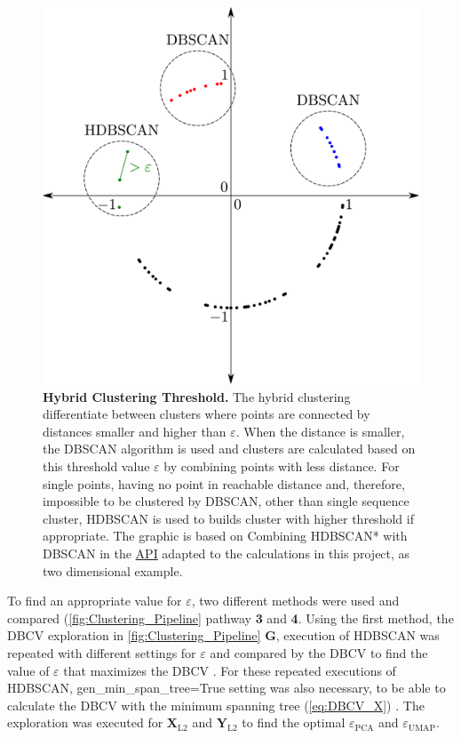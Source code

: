 \begin{figure}[!hbt]
    \centering
    \includegraphics[width=\textwidth]{Graphics/Hybrid.pdf}
    \caption[Hybrid Clustering Threshold]{\textbf{Hybrid Clustering Threshold.} The hybrid clustering differentiate between clusters where points are connected by distances smaller and higher than $\varepsilon$. When the distance is smaller, the \gls{DBSCAN} algorithm is used and clusters are calculated based on this threshold value $\varepsilon$ by combining points with less distance. For single points, having no point in reachable distance and, therefore, impossible to be clustered by \gls{DBSCAN}, other than single sequence cluster, \gls{HDBSCAN} is used to builds cluster with higher threshold if appropriate. The graphic is based on \glqq Combining HDBSCAN* with DBSCAN\grqq{} in the \href{https://hdbscan.readthedocs.io/en/latest/api.html}{API} adapted to the calculations in this project, as two dimensional example.}
    \label{fig:Hybrid}
\end{figure}

To find an appropriate value for $\varepsilon$, two different methods were used and compared (\autoref{fig:Clustering_Pipeline} pathway \textsf{\textbf{3}} and \textsf{\textbf{4}}. Using the first method, the \gls{DBCV} exploration in \autoref{fig:Clustering_Pipeline} \textsf{\textbf{G}}, execution of \gls{HDBSCAN} was repeated with different settings for $\varepsilon$ and compared by the \gls{DBCV} to find the value of $\varepsilon$ that maximizes the \gls{DBCV} \autocite{moulavi_density-based_2014}. For these repeated executions of \gls{HDBSCAN}, \colorbox{backcolour}{gen\_min\_span\_tree=True} setting was also necessary, to be able to calculate the \gls{DBCV} with the minimum spanning tree (\autoref{eq:DBCV_X}) \autocite{moulavi_density-based_2014, gower_minimum_1969}. The exploration was executed for $\mathbf{X}_{\text{L2}}$ and $\mathbf{Y}_{\text{L2}}$ to find the optimal $\varepsilon_{\text{PCA}}$ and $\varepsilon_{\text{UMAP}}$.

